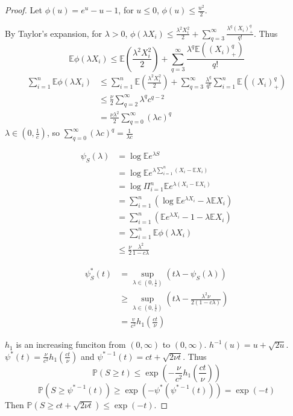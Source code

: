 \documentclass[11pt]{article}
\def\BP{{\bf P}}
\def\BE{{\mathbb E}}
\def\BP{{\mathbb P}}
\begin{document}
\begin{proof}
Let $\phi(u) = e^u -u - 1$, for $u \leq 0$, $\phi(u) \leq \frac{u^2}{2}$.

By Taylor's expansion, for $\lambda > 0$, 
$\phi(\lambda X_i) \leq \frac{\lambda^2 X_i^2}{2} + \sum_{q = 3}^{\infty} \frac{\lambda^q (X_i)_+^q}{q!}$. Thus
\[
	\BE \phi(\lambda X_i) \leq \BE (\frac{\lambda^2 X_i^2}{2}) + \sum_{q = 3}^{\infty} \frac{\lambda^q \BE ((X_i)_+^q)}{q !}
\]
\[\begin{split}
\sum_{i=1}^{n} \BE \phi(\lambda X_i) &\leq \sum_{i=1}^{n} \BE(\frac{\lambda^2 X_i^2}{2}) + \sum_{q=3}^{\infty} \frac{\lambda^q}{q!} \sum_{i=1}^{n} \BE ((X_i)_+^q)  \\
& \leq \frac{\nu}{2} \sum_{q=2}^\infty \lambda^q c^{q-2} \\
&= \frac{\nu\lambda^2}{2} \sum_{q=0}^\infty (\lambda c)^q
\end{split}
\]
$\lambda \in (0, \frac{1}{c})$, so $\sum_{q = 0}^{\infty} (\lambda c)^q = \frac{1}{\lambda c}$

\[\begin{split}
\psi_S(\lambda) &= \log \BE e^{\lambda S} \\
&= \log \BE e^{\lambda \sum_{i=1}^{n}(X_i - \BE X_i)} \\
&= \log \Pi_{i=1}^n \BE e^{\lambda (X_i - \BE X_i)} \\
&= \sum_{i=1}^{n} (\log\BE e^{\lambda X_i} - \lambda \BE X_i) \\
&= \sum_{i=1}^{n} (\BE e^{\lambda X_i} - 1 - \lambda \BE X_i) \\
& = \sum_{i = 1}^{n} \BE \phi(\lambda X_i) \\
&\leq \frac{\nu}{2} \frac{\lambda^2}{1-c\lambda}
\end{split}\]

\[\begin{split}
\psi_S^* (t) &= \sup_{\lambda \in (0, \frac{1}{c})} (t\lambda - \psi_S(\lambda )) \\
&\geq \sup_{\lambda \in (0, \frac{1}{c})} (t\lambda - \frac{\lambda^2 \nu}{2(1-c\lambda)}) \\
&= \frac{v}{c^2} h_1(\frac{ct}{\nu}) 
\end{split}
\]

$h_1$ is an increasing funciton from $(0, \infty)$ to $(0, \infty)$. $h^{-1}(u) = u + \sqrt{2u}$. $\psi^*(t) = \frac{\nu}{c^2} h_1(\frac{ct}{\nu})$ and $\psi^{*-1}(t) = ct + \sqrt{2\nu t}$. Thus
\[
	\BP(S \geq t) \leq \exp(-\frac{\nu}{c^2} h_1(\frac{ct}{\nu}))
\]
\[
	\BP(S \geq \psi^{*-1}(t)) \geq \exp(-\psi^*(\psi^{*-1}(t))) = \exp(-t)
\]
Then $\BP (S \geq ct + \sqrt{2\nu t}) \leq \exp(-t)$.
\end{proof}
\end{document}

